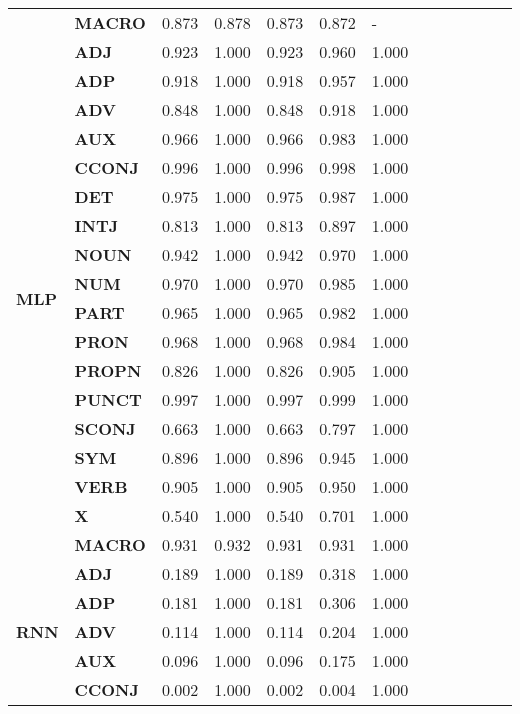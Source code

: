 \begin{longtable}{|l||l||l||l||l||l||l||l||l||l||l||l||l|}
\textbf{} & \textbf{MACRO} & 0.873 & 0.878 & 0.873 & 0.872 & - \\
\cline{1-7}
\multirow[t]{18}{*}{\textbf{MLP}} & \textbf{ADJ} & 0.923 & 1.000 & 0.923 & 0.960 & 1.000 \\
\textbf{} & \textbf{ADP} & 0.918 & 1.000 & 0.918 & 0.957 & 1.000 \\
\textbf{} & \textbf{ADV} & 0.848 & 1.000 & 0.848 & 0.918 & 1.000 \\
\textbf{} & \textbf{AUX} & 0.966 & 1.000 & 0.966 & 0.983 & 1.000 \\
\textbf{} & \textbf{CCONJ} & 0.996 & 1.000 & 0.996 & 0.998 & 1.000 \\
\textbf{} & \textbf{DET} & 0.975 & 1.000 & 0.975 & 0.987 & 1.000 \\
\textbf{} & \textbf{INTJ} & 0.813 & 1.000 & 0.813 & 0.897 & 1.000 \\
\textbf{} & \textbf{NOUN} & 0.942 & 1.000 & 0.942 & 0.970 & 1.000 \\
\textbf{} & \textbf{NUM} & 0.970 & 1.000 & 0.970 & 0.985 & 1.000 \\
\textbf{} & \textbf{PART} & 0.965 & 1.000 & 0.965 & 0.982 & 1.000 \\
\textbf{} & \textbf{PRON} & 0.968 & 1.000 & 0.968 & 0.984 & 1.000 \\
\textbf{} & \textbf{PROPN} & 0.826 & 1.000 & 0.826 & 0.905 & 1.000 \\
\textbf{} & \textbf{PUNCT} & 0.997 & 1.000 & 0.997 & 0.999 & 1.000 \\
\textbf{} & \textbf{SCONJ} & 0.663 & 1.000 & 0.663 & 0.797 & 1.000 \\
\textbf{} & \textbf{SYM} & 0.896 & 1.000 & 0.896 & 0.945 & 1.000 \\
\textbf{} & \textbf{VERB} & 0.905 & 1.000 & 0.905 & 0.950 & 1.000 \\
\textbf{} & \textbf{X} & 0.540 & 1.000 & 0.540 & 0.701 & 1.000 \\
\textbf{} & \textbf{MACRO} & 0.931 & 0.932 & 0.931 & 0.931 & 1.000 \\
\cline{1-7}
\multirow[t]{18}{*}{\textbf{RNN}} & \textbf{ADJ} & 0.189 & 1.000 & 0.189 & 0.318 & 1.000 \\
\textbf{} & \textbf{ADP} & 0.181 & 1.000 & 0.181 & 0.306 & 1.000 \\
\textbf{} & \textbf{ADV} & 0.114 & 1.000 & 0.114 & 0.204 & 1.000 \\
\textbf{} & \textbf{AUX} & 0.096 & 1.000 & 0.096 & 0.175 & 1.000 \\
\textbf{} & \textbf{CCONJ} & 0.002 & 1.000 & 0.002 & 0.004 & 1.000 \\

\end{longtable}
